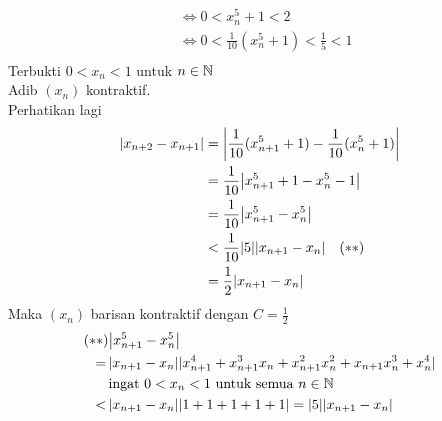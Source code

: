 \documentclass{article}
\begin{document}
\begin{enumerate}[leftmargin=*, label={\arabic*}.]
\begin{align*}
    & \iff 0 < x_n^5 + 1 < 2\\
    & \iff 0 < \frac{1}{10}(x_n^5 + 1) < \frac{1}{5} < 1\\
\end{align*}
Terbukti $0 < x_n < 1$ untuk $n \in \mathbb{N}$\\
Adib $(x_n)$ kontraktif.\\
Perhatikan lagi
\begin{align*}
    |x_{n+2} - x_{n+1}| &= \abs*{\frac{1}{10}(x_{n+1}^5+1)-\frac{1}{10}(x_n^5+1)}\\
    &= \frac{1}{10}\abs*{x_{n+1}^5+1-x_n^5-1}\\
    &= \frac{1}{10}\abs*{x_{n+1}^5-x_n^5}\\
    &< \frac{1}{10}\abs{5}\abs*{x_{n+1}-x_n}\quad (**)\\
    &= \frac{1}{2}\abs*{x_{n+1}-x_n}
\end{align*}
Maka $(x_n)$ barisan kontraktif dengan $C=\frac{1}{2}$
\begin{align*}
    (**) &\abs*{x_{n+1}^5-x_n^5}\\
    =\, & \abs{x_{n+1}-x_n}\abs{x_{n+1}^4+x_{n+1}^3x_n+x_{n+1}^2x_n^2+x_{n+1}x_n^3+x_n^4}\\
    &\text{ingat $0 < x_n < 1$ untuk semua $n \in \N$}\\
    <\, & \abs{x_{n+1}-x_n}\abs{1+1+1+1+1} = |5|\abs{x_{n+1}-x_n}
\end{align*}


\end{enumerate}
\end{document}
